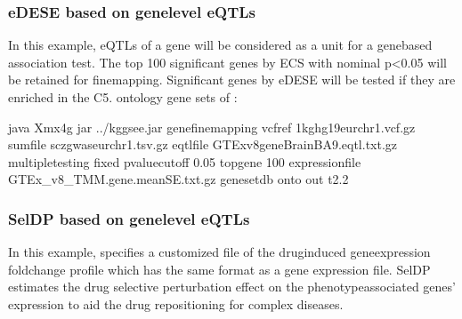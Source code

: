 \documentclass[letterpaper,10pt,english,openany,oneside]{sphinxmanual}
\begin{document}
\subsubsection{eDESE based on gene\sphinxhyphen{}level eQTLs}
\label{\detokenize{detailed_document:edese-based-on-gene-level-eqtls}}
\sphinxAtStartPar
In this example, eQTLs of a gene will be considered as a unit for a gene\sphinxhyphen{}based association test. The top 100 significant genes by ECS with nominal p\textless{}0.05 will be retained for fine\sphinxhyphen{}mapping. Significant genes by eDESE will be tested if they are enriched in the C5. ontology gene sets of :

\begin{sphinxVerbatim}[commandchars=\\\{\}]
java \PYGZhy{}Xmx4g \PYGZhy{}jar ../kggsee.jar 
  \PYGZhy{}\PYGZhy{}gene\PYGZhy{}finemapping 
  \PYGZhy{}\PYGZhy{}vcf\PYGZhy{}ref 1kg\PYGZus{}hg19\PYGZus{}eur\PYGZus{}chr1.vcf.gz 
  \PYGZhy{}\PYGZhy{}sum\PYGZhy{}file scz\PYGZus{}gwas\PYGZus{}eur\PYGZus{}chr1.tsv.gz 
  \PYGZhy{}\PYGZhy{}eqtl\PYGZhy{}file GTEx\PYGZus{}v8\PYGZus{}gene\PYGZus{}BrainBA9.eqtl.txt.gz 
  \PYGZhy{}\PYGZhy{}multiple\PYGZhy{}testing fixed 
  \PYGZhy{}\PYGZhy{}p\PYGZhy{}value\PYGZhy{}cutoff 0.05 
  \PYGZhy{}\PYGZhy{}top\PYGZhy{}gene 100 
  \PYGZhy{}\PYGZhy{}expression\PYGZhy{}file GTEx_v8_TMM.gene.meanSE.txt.gz 
  \PYGZhy{}\PYGZhy{}geneset\PYGZhy{}db onto 
  \PYGZhy{}\PYGZhy{}out t2.2
\end{sphinxVerbatim}


\subsubsection{SelDP based on gene\sphinxhyphen{}level eQTLs}
\label{\detokenize{detailed_document:seldp-based-on-gene-level-eqtls}}
\sphinxAtStartPar
In this example,  specifies a customized file of the drug\sphinxhyphen{}induced gene\sphinxhyphen{}expression fold\sphinxhyphen{}change profile which has the same format as a gene expression file. SelDP estimates the drug selective perturbation effect on the phenotype\sphinxhyphen{}associated genes’ expression to aid the drug repositioning for complex diseases.
\end{document}
